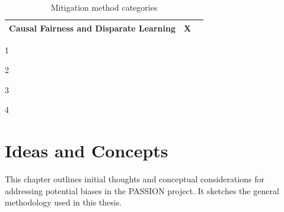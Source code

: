 \documentclass[12pt, a4paper, oneside]{book}   	%
\newcommand{\tblWidthDescription}{\hsize=0.6\hsize\raggedright}
\newcommand{\tblWidthContext}{\hsize=0.18\hsize}
\begin{document}
\begin{table}[H]
\begin{threeparttable}
\begin{tabularx}{\textwidth}{>{\tblWidthDescription}X|>{\tblWidthContext}X|>{\tblWidthContext}X}
						Causal Fairness and Disparate Learning & X\tnote{1} &  \\
						\bottomrule
					\end{tabularx}
					\begin{tablenotes}
						\footnotesize
						\begin{minipage}{0.33\textwidth}\raggedright
							\item[1] \autocite{Mehrabi_2021}
							\item[2] \autocite{Chakraborty_2024}
						\end{minipage}%
						\begin{minipage}{0.33\textwidth}\raggedright
							\item[3] \autocite{Young_2020}
						\end{minipage}%
						\begin{minipage}{0.33\textwidth}\raggedright
							\item[4] \autocite{Montoya_2025}
						\end{minipage}%
					\end{tablenotes}
				\end{threeparttable}
				\caption{Mitigation method categories}
				\label{tab:mitigation_methods_categories}
			\end{table}
	
	\chapter{Ideas and Concepts}
		This chapter outlines initial thoughts and conceptual considerations for addressing potential biases in the PASSION project. It sketches the general methodology used in this thesis.
		
\end{document}
